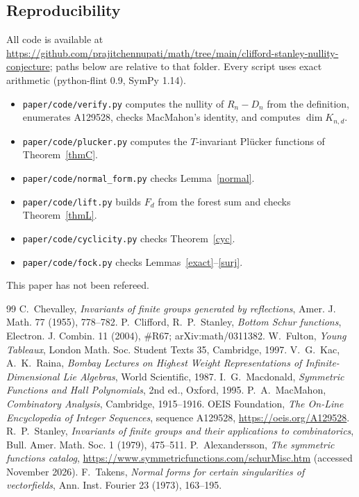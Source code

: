 \documentclass[11pt]{article}
\theoremstyle{definition}
\theoremstyle{remark}
\begin{document}
\subsection*{Reproducibility}
{\sloppy All code is available at
\url{https://github.com/prajitchennupati/math/tree/main/clifford-stanley-nullity-conjecture}; paths below are
relative to that folder. Every script uses exact arithmetic (python-flint 0.9, SymPy 1.14).
\begin{itemize}
\item \texttt{paper/code/verify.py} computes the nullity of $R_n-D_n$ from the definition, enumerates A129528, checks
MacMahon's identity, and computes $\dim K_{n,d}$.
\item \texttt{paper/code/plucker.py} computes the $T$-invariant Pl\"ucker functions of Theorem~\ref{thmC}.
\item \texttt{paper/code/normal\_form.py} checks Lemma~\ref{normal}.
\item \texttt{paper/code/lift.py} builds $F_d$ from the forest sum and checks Theorem~\ref{thmL}.
\item \texttt{paper/code/cyclicity.py} checks Theorem~\ref{cyc}.
\item \texttt{paper/code/fock.py} checks Lemmas~\ref{exact}--\ref{surj}.
\end{itemize}
This paper has not been refereed.\par}

\begin{thebibliography}{99}
 C.~Chevalley, \emph{Invariants of finite groups generated by reflections}, Amer. J. Math. 77 (1955),
778--782.
 P.~Clifford, R.~P.~Stanley, \emph{Bottom Schur functions}, Electron. J. Combin. 11 (2004), \#R67;
arXiv:math/0311382.
 W.~Fulton, \emph{Young Tableaux}, London Math. Soc. Student Texts 35, Cambridge, 1997.
 V.~G.~Kac, A.~K.~Raina, \emph{Bombay Lectures on Highest Weight Representations of
Infinite-Dimensional Lie Algebras}, World Scientific, 1987.
 I.~G.~Macdonald, \emph{Symmetric Functions and Hall Polynomials}, 2nd ed., Oxford, 1995.
 P.~A.~MacMahon, \emph{Combinatory Analysis}, Cambridge, 1915--1916.
 OEIS Foundation, \emph{The On-Line Encyclopedia of Integer Sequences}, sequence A129528,
\url{https://oeis.org/A129528}.
 R.~P.~Stanley, \emph{Invariants of finite groups and their applications to combinatorics}, Bull.
Amer. Math. Soc. 1 (1979), 475--511.
 P.~Alexandersson, \emph{The symmetric functions catalog}, \url{https://www.symmetricfunctions.com/schurMisc.htm}
(accessed November 2026).
 F.~Takens, \emph{Normal forms for certain singularities of vectorfields}, Ann. Inst. Fourier 23
(1973), 163--195.
\end{thebibliography}
\end{document}
